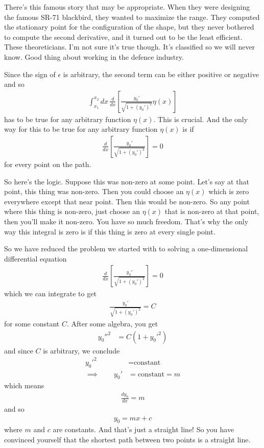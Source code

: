 There's this famous story that may be appropriate.
When they were designing the famous SR-71 blackbird,
they wanted to maximize the range.
They computed the stationary point for the configuration of the shape,
but they never bothered to compute the second derivative,
and it turned out to be the least efficient.
These theoreticians.
I'm not sure it's true though.
It's classified so we will never know.
Good thing about working in the defence industry.

Since the sign of $\epsilon$ is arbitrary,
the second term can be either positive or negative
and so
\begin{align}
    \int_{x_1}^{x_2}dx\,
    \frac{d}{dx}\left[ 
    \frac{y_0'}{\sqrt{1 + \left( y_0' \right)^2}}
    \eta(x)
    \right]
\end{align}
has to be true for any arbitrary function $\eta(x)$.
This is crucial.
And the only way for this to be true for any arbitrary function
$\eta(x)$
is if
\begin{align}
    \frac{d}{dx}\left[
    \frac{y_0'}{\sqrt{1 + \left( y_0' \right)^2}}
    \right] = 0
\end{align}
for every point on the path.

So here's the logic.
Suppose this was non-zero at some point.
Let's say at that point,
this thing was non-zero.
Then you could choose an $\eta(x)$
which is zero everywhere except that near point.
Then this would be non-zero.
So any point where this thing is non-zero,
just choose an $\eta(x)$ that is non-zero at that point,
then you'll make it non-zero.
You have so much freedom.
That's why the only way this integral is zero
is if this thing is zero at every single point.

So we have reduced the problem we started with
to solving a one-dimensional differential equation
\begin{align}
    \frac{d}{dx}\left[ 
    \frac{y_0'}{\sqrt{1 + \left( y_0' \right)^2}}
    \right] = 0
\end{align}
which we can integrate to get
\begin{align}
    \frac{y_0'}{\sqrt{1 + \left( y_0' \right)^2}}
    = C
\end{align}
for some constant $C$.
After some algebra, you get
\begin{align}
    y_0''^2 &=
    C(1 + y_0'^2)
\end{align}
and since $C$ is arbitrary,
we conclude
\begin{align}
    y_0'^2 &= \text{constant}\\
    \implies \qquad y_0' &= \text{constant} = m
\end{align}
which means
\begin{align}
    \frac{dy_0}{dx} = m
\end{align}
and so
\begin{align}
    y_0 = mx + c
\end{align}
where $m$ and $c$ are constants.
And that's just a straight line!
So you have convinced yourself that the shortest path between two points is a
straight line.

